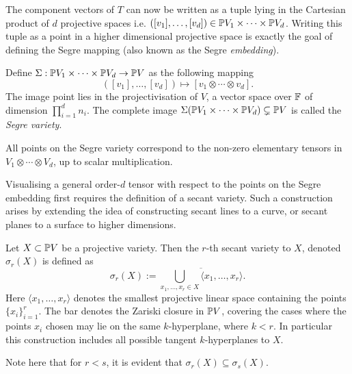 \documentclass[../Lael_John_MasterThesis_Draft.tex]{subfiles}
\begin{document}
The component vectors of $T$ can now be written as a tuple lying in the Cartesian product of $d$ projective spaces i.e. $([v_1], \ldots, [v_d]) \in \mathbb{P} V_1 \times \cdots \times \mathbb{P} V_d$. Writing this tuple as a point in a higher dimensional projective space is exactly the goal of defining the Segre mapping (also known as the Segre \textit{embedding}).
\begin{definition}\label{defn:segremapping}
    Define $\Sigma: \mathbb{P} V_1 \times \cdots \times \mathbb{P} V_d \to \mathbb{P} V$ as the following mapping $$([v_1], \ldots, [v_d]) \mapsto [v_1 \otimes \cdots \otimes v_d].$$The image point lies in the projectivisation of $V$, a vector space over $\mathbb{F}$ of dimension $\prod_{i=1}^{d} n_i$. The complete image $\Sigma(\mathbb{P} V_1 \times \cdots \times \mathbb{P} V_d) \subsetneq \mathbb{P} V$ is called the \textit{Segre variety}. 
\end{definition}
\begin{remark}
    All points on the Segre variety correspond to the non-zero elementary tensors in $V_1 \otimes \cdots \otimes V_d$, up to scalar multiplication. 
\end{remark}
Visualising a general order-$d$ tensor with respect to the points on the Segre embedding first requires the definition of a secant variety. Such a construction arises by extending the idea of constructing secant lines to a curve, or secant planes to a surface to higher dimensions. 
\begin{definition}\label{defn:rsecantvariety}
    Let $X \subset \mathbb{P} V$ be a projective variety. Then the $r$-th secant variety to $X$, denoted $\sigma_r(X)$ is defined as
    \begin{equation}\label{eqn:rsecantvariety}
        \sigma_r(X) := \overline{\bigcup_{x_1, \ldots, x_r \in X} \langle x_1, \ldots, x_r \rangle}.
    \end{equation}
    Here $\langle x_1, \ldots, x_r \rangle$ denotes the smallest projective linear space containing the points $\{x_i\}_{i=1}^r$. The bar denotes the Zariski closure in $\mathbb{P} V$, covering the cases where the points $x_i$ chosen may lie on the same $k$-hyperplane, where $k < r$. In particular this construction includes all possible tangent $k$-hyperplanes to $X$.
\end{definition}
\begin{remark}
    Note here that for $r < s$, it is evident that $\sigma_r(X) \subseteq \sigma_s(X)$.
\end{remark}
\end{document}
